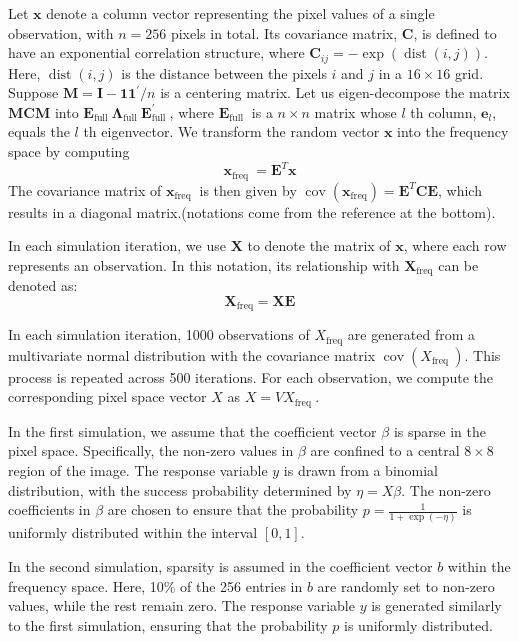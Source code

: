 \documentclass[12pt]{article}
\begin{document}
Let \( \mathbf{x} \) denote a column vector representing the pixel values of a single observation, with \( n = 256 \) pixels in total. Its covariance matrix, \( \mathbf{C} \), is defined to have an exponential correlation structure, where \( \mathbf{C}_{i j}=-\exp (\operatorname{dist}(i, j)) \). Here, \( \operatorname{dist}(i, j) \) is the distance between the pixels \( i \) and \( j \) in a \( 16 \times 16 \) grid. Suppose \( \mathbf{M} = \mathbf{I} - \mathbf{1} \mathbf{1}^{\prime} / n \) is a centering matrix. Let us eigen-decompose the matrix \( \mathbf{MCM} \) into \( \mathbf{E}_{\text {full }} \mathbf{\Lambda}_{\text {full }} \mathbf{E}_{\text {full }}^{\prime} \), where \( \mathbf{E}_{\text {full }} \) is a \( n \times n \) matrix whose \( l \) th column, \( \mathbf{e}_l \), equals the \( l \) th eigenvector. We transform the random vector \( \mathbf{x} \) into the frequency space by computing 
\[
  \mathbf{x}_{\text {freq }}= \mathbf{E}^T \mathbf{x}
\]
The covariance matrix of \( \mathbf{x}_{\text {freq }} \) is then given by \( \operatorname{cov}(\mathbf{x}_{\mathrm{freq}}) = \mathbf{E}^T \mathbf{C} \mathbf{E} \), which results in a diagonal matrix.(notations come from the reference at the bottom).

In each simulation iteration, we use \( \mathbf{X} \) to denote the matrix of \( \mathbf{x} \), where each row represents an observation. In this notation, its relationship with \( \mathbf{X}_{\mathrm{freq}} \) can be denoted as:
\[
  \mathbf{X}_{\mathrm{freq}} = \mathbf{X} \mathbf{E}
\]


In each simulation iteration, 1000 observations of \( X_{\text {freq}} \) are generated from a multivariate normal
distribution with the covariance matrix \(\operatorname{cov}\left(X_{\text {freq }}\right) \). This process is repeated
across 500 iterations.  For each observation, we compute the corresponding pixel space vector \( X \) as \( X=V X_{\text
		{freq }} \).

In the first simulation, we assume that the coefficient vector \( \beta \) is sparse in the pixel space. Specifically,
the non-zero values in \( \beta \) are confined to a central \( 8 \times 8 \) region of the image. The response variable
\( y \) is drawn from a binomial distribution, with the success probability determined by \( \eta = X \beta \). The
non-zero coefficients in \( \beta \) are chosen to ensure that the probability \( p = \frac{1}{1 + \exp(-\eta)} \) is
uniformly distributed within the interval \( [0, 1] \).

In the second simulation, sparsity is assumed in the coefficient vector \( b \) within the frequency space. Here, 10\%
of the 256 entries in \( b \) are randomly set to non-zero values, while the rest remain zero. The response variable \(
y \) is generated similarly to the first simulation, ensuring that the probability \( p \) is uniformly distributed.
\end{document}
